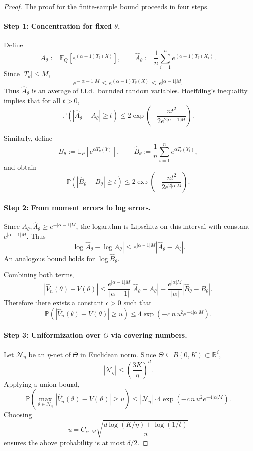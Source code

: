 \documentclass{article}
\theoremstyle{plain}
\theoremstyle{definition}
\theoremstyle{remark}
\begin{document}
\begin{proof}
The proof for the finite-sample bound proceeds in four steps.

\paragraph{Step 1: Concentration for fixed $\theta$.}
Define
\[
A_\theta := \mathbb{E}_{Q}[e^{(\alpha-1)T_\theta(X)}],
\qquad
\widehat A_\theta := \frac{1}{n}\sum_{i=1}^n e^{(\alpha-1)T_\theta(X_i)}.
\]
Since $|T_\theta|\le M$,
\[
e^{-|\alpha-1|M} \le e^{(\alpha-1)T_\theta(X)} \le e^{|\alpha-1|M}.
\]
Thus $\widehat A_\theta$ is an average of i.i.d.\ bounded random variables.
Hoeffding's inequality implies that for all $t>0$,
\[
\mathbb{P}\left(|\widehat A_\theta-A_\theta|\ge t\right)
\le
2\exp\left(-\frac{n t^2}{2e^{2|\alpha-1|M}}\right).
\]

Similarly, define
\[
B_\theta := \mathbb{E}_{P}[e^{\alpha T_\theta(Y)}],
\qquad
\widehat B_\theta := \frac{1}{n}\sum_{i=1}^n e^{\alpha T_\theta(Y_i)},
\]
and obtain
\[
\mathbb{P}\left(|\widehat B_\theta-B_\theta|\ge t\right)
\le
2\exp\left(-\frac{n t^2}{2e^{2|\alpha|M}}\right).
\]

\paragraph{Step 2: From moment errors to log errors.}
Since $A_\theta,\widehat A_\theta \ge e^{-|\alpha-1|M}$,
the logarithm is Lipschitz on this interval with constant $e^{|\alpha-1|M}$.
Thus
\[
|\log \widehat A_\theta-\log A_\theta|
\le
e^{|\alpha-1|M}|\widehat A_\theta-A_\theta|.
\]
An analogous bound holds for $\log \widehat B_\theta$.

Combining both terms,
\[
|\widehat V_n(\theta)-V(\theta)|
\le
\frac{e^{|\alpha-1|M}}{|\alpha-1|}|\widehat A_\theta-A_\theta|
+
\frac{e^{|\alpha|M}}{|\alpha|}|\widehat B_\theta-B_\theta|.
\]
Therefore there exists a constant $c>0$ such that
\[
\mathbb{P}\left(|\widehat V_n(\theta)-V(\theta)|\ge u\right)
\le
4\exp\left(-c\,n\,u^2 e^{-4|\alpha|M}\right).
\]

\paragraph{Step 3: Uniformization over $\Theta$ via covering numbers.}
Let $\mathcal{N}_\eta$ be an $\eta$-net of $\Theta$ in Euclidean norm.
Since $\Theta\subseteq B(0,K)\subset\mathbb{R}^d$,
\[
|\mathcal{N}_\eta| \le \left(\frac{3K}{\eta}\right)^d.
\]
Applying a union bound,
\[
\mathbb{P}\left(
\max_{\vartheta\in\mathcal{N}_\eta}
|\widehat V_n(\vartheta)-V(\vartheta)|
\ge u
\right)
\le
|\mathcal{N}_\eta|\cdot
4\exp\left(-c\,n\,u^2 e^{-4|\alpha|M}\right).
\]
Choosing
\[
u
=
C_{\alpha,M}
\sqrt{\frac{d\log(K/\eta)+\log(1/\delta)}{n}}
\]
ensures the above probability is at most $\delta/2$.


\end{proof}
\end{document}
